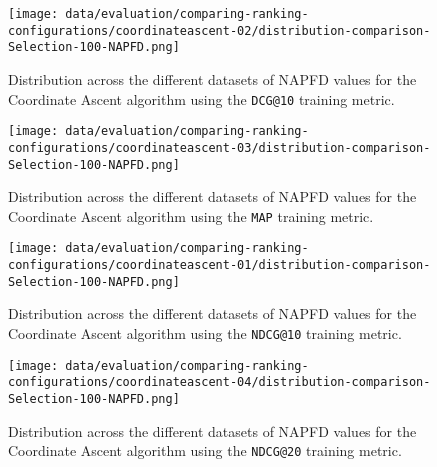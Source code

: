 \begin{figure}
    \centering
    \begin{minipage}{.45\textwidth}
        \centering
        \label{fig:coordinate-ascent-02-napfd}
        \texttt{[image: data/evaluation/comparing-ranking-configurations/coordinateascent-02/distribution-comparison-Selection-100-NAPFD.png]}
        \parbox{0.9\textwidth}{\caption{Distribution across the different datasets of NAPFD values for the Coordinate Ascent algorithm using the \texttt{DCG@10} training metric.}}
    \end{minipage}%
    \begin{minipage}{.45\textwidth}
        \centering
        \label{fig:coordinate-ascent-03-napfd}
        \texttt{[image: data/evaluation/comparing-ranking-configurations/coordinateascent-03/distribution-comparison-Selection-100-NAPFD.png]}
        \parbox{0.9\textwidth}{\caption{Distribution across the different datasets of NAPFD values for the Coordinate Ascent algorithm using the \texttt{MAP} training metric.}}
    \end{minipage}%
\end{figure}

\begin{figure}
    \centering
    \begin{minipage}{.45\textwidth}
        \centering
        \label{fig:coordinate-ascent-01-napfd}
        \texttt{[image: data/evaluation/comparing-ranking-configurations/coordinateascent-01/distribution-comparison-Selection-100-NAPFD.png]}
        \parbox{0.9\textwidth}{\caption{Distribution across the different datasets of NAPFD values for the Coordinate Ascent algorithm using the \texttt{NDCG@10} training metric.}}
    \end{minipage}%
    \begin{minipage}{.45\textwidth}
        \centering
        \label{fig:coordinate-ascent-04-napfd}
        \texttt{[image: data/evaluation/comparing-ranking-configurations/coordinateascent-04/distribution-comparison-Selection-100-NAPFD.png]}
        \parbox{0.9\textwidth}{\caption{Distribution across the different datasets of NAPFD values for the Coordinate Ascent algorithm using the \texttt{NDCG@20} training metric.}}
    \end{minipage}%
\end{figure}

